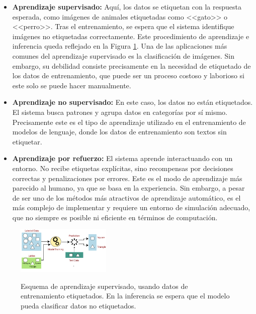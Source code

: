 \begin{itemize}
    \item \textbf{Aprendizaje supervisado:} Aquí, los datos se etiquetan con la respuesta esperada, como imágenes de animales etiquetadas como <<gato>> o <<perro>>. Tras el entrenamiento, se espera que el sistema identifique imágenes no etiquetadas correctamente. Este procedimiento de aprendizaje e inferencia queda reflejado en la Figura \ref{fig:labeled_data_training}. Una de las aplicaciones más comunes del aprendizaje supervisado es la clasificación de imágenes. Sin embargo, su debilidad consiste precisamente en la necesidad de etiquetado de los datos de entrenamiento, que puede ser un proceso costoso y laborioso si este solo se puede hacer manualmente.
    
    \item \textbf{Aprendizaje no supervisado:} En este caso, los datos no están etiquetados. El sistema busca patrones y agrupa datos en categorías por sí mismo. Precisamente este es el tipo de aprendizaje utilizado en el entrenamiento de modelos de lenguaje, donde los datos de entrenamiento son textos sin etiquetar.
    
    \item \textbf{Aprendizaje por refuerzo:} El sistema aprende interactuando con un entorno. No recibe etiquetas explícitas, sino recompensas por decisiones correctas y penalizaciones por errores. Este es el modo de aprendizaje más parecido al humano, ya que se basa en la experiencia. Sin embargo, a pesar de ser uno de los métodos más atractivos de aprendizaje automático, es el más complejo de implementar y requiere un entorno de simulación adecuado, que no siempre es posible ni eficiente en términos de computación.
\end{itemize}

\begin{figure}[H]
    \caption[Esquema de aprendizaje supervisado]{Esquema de aprendizaje supervisado, usando datos de entrenamiento etiquetados. En la inferencia se espera que el modelo pueda clasificar datos no etiquetados.}
    \centering
    \includegraphics[width=0.4\textwidth]{./figuras/labeled_data_training.png}
    \label{fig:labeled_data_training}
\end{figure}


